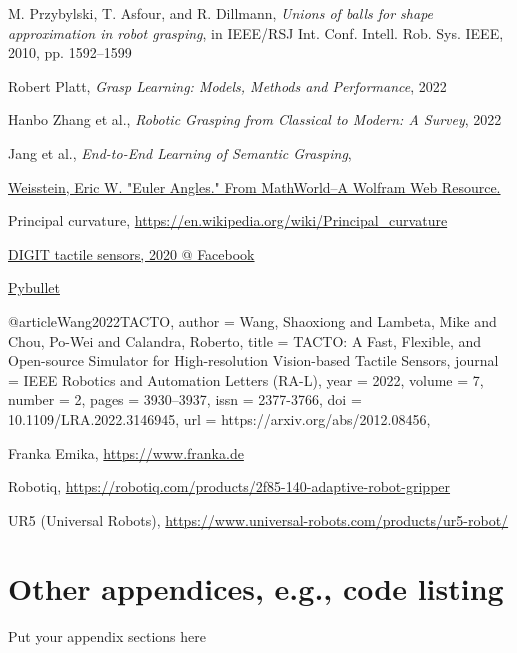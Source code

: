 \documentclass[12pt, a4paper]{report}
\theoremstyle{definition}
\begin{document}
\begin{thebibliography}{9}
    M. Przybylski, T. Asfour, and R. Dillmann,
    \textit{Unions of balls for shape approximation in robot grasping}, in IEEE/RSJ Int. Conf. Intell. Rob. Sys. IEEE, 2010, pp. 1592–1599

    Robert Platt,
    \textit{Grasp Learning: Models, Methods and Performance},
    2022

    Hanbo Zhang et al.,
    \textit{Robotic Grasping from Classical to Modern: A Survey},
    2022
    
    Jang et al.,
    \textit{End-to-End Learning of Semantic Grasping},
    

    \href{https://mathworld.wolfram.com/EulerAngles.html}{Weisstein, Eric W. "Euler Angles." From MathWorld--A Wolfram Web Resource.}

    Principal curvature, \href{https://en.wikipedia.org/wiki/Principal_curvature}{https://en.wikipedia.org/wiki/Principal_curvature}

    \href{https://digit.ml/}{DIGIT tactile sensors, 2020 @ Facebook}

    \href{https://pybullet.org/wordpress/}{Pybullet}

@article{Wang2022TACTO,
  author   = {Wang, Shaoxiong and Lambeta, Mike and Chou, Po-Wei and Calandra, Roberto},
  title    = {{TACTO}: A Fast, Flexible, and Open-source Simulator for High-resolution Vision-based Tactile Sensors},
  journal  = {IEEE Robotics and Automation Letters (RA-L)},
  year     = {2022},
  volume   = {7},
  number   = {2},
  pages    = {3930--3937},
  issn     = {2377-3766},
  doi      = {10.1109/LRA.2022.3146945},
  url      = {https://arxiv.org/abs/2012.08456},
}

    Franka Emika, \href{https://www.franka.de}{https://www.franka.de}

    Robotiq, \href{https://robotiq.com/products/2f85-140-adaptive-robot-gripper}{https://robotiq.com/products/2f85-140-adaptive-robot-gripper}

    UR5 (Universal Robots), \href{https://www.universal-robots.com/products/ur5-robot/}{https://www.universal-robots.com/products/ur5-robot/}

\end{thebibliography}

\chapter{Other appendices, e.g., code listing}
Put your appendix sections here
\end{document}
